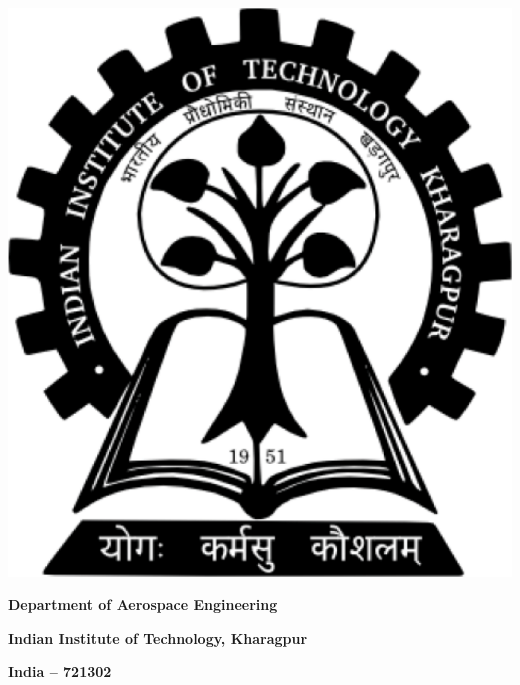 \documentclass{iitkgpthesis}
\begin{document}
\newpage
\thispagestyle{empty}
{~}
\vfill
\begin{center}
\includegraphics[scale=0.12]{iitlogo.pdf}
\end{center}
 \vspace{-3em}
\begin{center}
\textbf{Department of Aerospace Engineering}
\end{center}
 \vspace{-3em}
\begin{center}
\textbf{Indian Institute of Technology, Kharagpur}
\end{center}
 \vspace{-3em}
\begin{center}
\textbf{India -- 721302}
\end{center}
\end{document}
